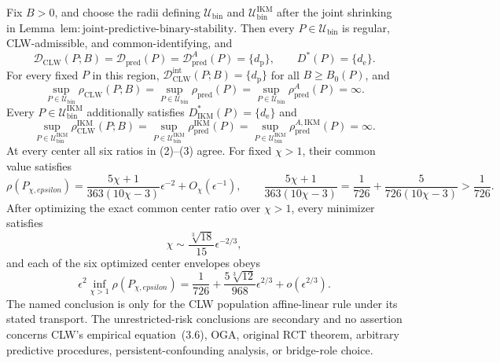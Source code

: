 Fix \(B>0\), and choose the radii defining \(\mathcal U_{\mathrm{bin}}\) and \(\mathcal U_{\mathrm{bin}}^{\mathrm{IKM}}\) after the joint shrinking in Lemma~\(\mathrm{lem{:}joint\text{-}predictive\text{-}binary\text{-}stability}\). Then every \(P\in\mathcal U_{\mathrm{bin}}\) is regular, CLW-admissible, and common-identifying, and
\[
 \mathcal D_{\mathrm{CLW}}(P;B)
 =\mathcal D_{\mathrm{pred}}(P)
 =\mathcal D_{\mathrm{pred}}^A(P)
 =\{d_{\mathrm p}\},
 \qquad D^*(P)=\{d_{\mathrm e}\}.                         \tag{1}
\]
For every fixed \(P\) in this region, \(\mathcal D_{\mathrm{CLW}}^{\mathrm{int}}(P;B)=\{d_{\mathrm p}\}\) for all \(B\ge B_0(P)\), and
\[
 \sup_{P\in\mathcal U_{\mathrm{bin}}}\rho_{\mathrm{CLW}}(P;B)
 =\sup_{P\in\mathcal U_{\mathrm{bin}}}\rho_{\mathrm{pred}}(P)
 =\sup_{P\in\mathcal U_{\mathrm{bin}}}\rho_{\mathrm{pred}}^A(P)
 =\infty.                                                   \tag{2}
\]
Every \(P\in\mathcal U_{\mathrm{bin}}^{\mathrm{IKM}}\) additionally satisfies \(D_{\mathrm{IKM}}^*(P)=\{d_{\mathrm e}\}\) and
\[
 \sup_{P\in\mathcal U_{\mathrm{bin}}^{\mathrm{IKM}}}
 \rho_{\mathrm{CLW}}^{\mathrm{IKM}}(P;B)
 =\sup_{P\in\mathcal U_{\mathrm{bin}}^{\mathrm{IKM}}}
 \rho_{\mathrm{pred}}^{\mathrm{IKM}}(P)
 =\sup_{P\in\mathcal U_{\mathrm{bin}}^{\mathrm{IKM}}}
 \rho_{\mathrm{pred}}^{A,\mathrm{IKM}}(P)
 =\infty.                                                   \tag{3}
\]
At every center all six ratios in (2)--(3) agree. For fixed \(\chi>1\), their common value satisfies
\[
 \rho(P_{\chi,epsilon})
 =\frac{5\chi+1}{363(10\chi-3)}\epsilon^{-2}
 +O_\chi(\epsilon^{-1}),
 \qquad
 \frac{5\chi+1}{363(10\chi-3)}
 =\frac1{726}+\frac5{726(10\chi-3)}>\frac1{726}.          \tag{4}
\]
After optimizing the exact common center ratio over \(\chi>1\), every minimizer satisfies
\[
 \chi\sim\frac{\sqrt[3]{18}}{15}\epsilon^{-2/3},         \tag{5}
\]
and each of the six optimized center envelopes obeys
\[
 \epsilon^2\inf_{\chi>1}\rho(P_{\chi,epsilon})
 =\frac1{726}+\frac{5\sqrt[3]{12}}{968}\epsilon^{2/3}
 +o(\epsilon^{2/3}).                                       \tag{6}
\]
The named conclusion is only for the CLW population affine-linear rule under its stated transport. The unrestricted-risk conclusions are secondary and no assertion concerns CLW's empirical equation~(3.6), OGA, original RCT theorem, arbitrary predictive procedures, persistent-confounding analysis, or bridge-role choice.